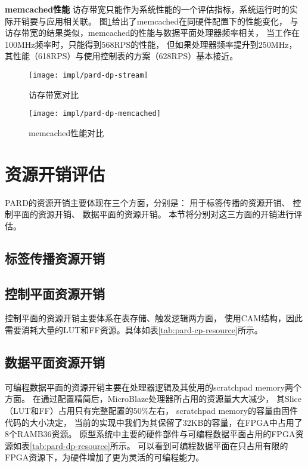 \textbf{memcached性能}\quad
访存带宽只能作为系统性能的一个评估指标，系统运行时的实际开销要与应用相关联。
图\ref{fig:pard-dp-memcached}给出了memcached在同硬件配置下的性能变化，
与访存带宽的结果类似，memcached的性能与数据平面处理器频率相关，
当工作在100MHz频率时，只能得到568RPS的性能，
但如果处理器频率提升到250MHz，其性能（618RPS）与使用控制表的方案（628RPS）基本接近。

\begin{figure}[tb]
\begin{minipage}{0.48\textwidth}
  \centering
  \texttt{[image: impl/pard-dp-stream]}
  \caption{访存带宽对比}
  \label{fig:pard-dp-stream}
\end{minipage}\hfill
\begin{minipage}{0.48\textwidth}
  \centering
  \texttt{[image: impl/pard-dp-memcached]}
  \caption{memcached性能对比}
  \label{fig:pard-dp-memcached}
\end{minipage}
\end{figure}


\section{资源开销评估}

PARD的资源开销主要体现在三个方面，分别是：
用于标签传播的资源开销、
控制平面的资源开销、
数据平面的资源开销。
本节将分别对这三方面的开销进行评估。

\subsection{标签传播资源开销}

\subsection{控制平面资源开销}

控制平面的资源开销主要体系在表存储、触发逻辑两方面，
使用CAM结构，因此需要消耗大量的LUT和FF资源。具体如表\ref{tab:pard-cp-resource}所示。


\subsection{数据平面资源开销}

可编程数据平面的资源开销主要在处理器逻辑及其使用的scratchpad memory两个方面。
在通过配置精简后，MicroBlaze处理器所占用的资源量大大减少，
其Slice（LUT和FF）占用只有完整配置的50\%左右，
scratchpad memory的容量由固件代码的大小决定，
当前的实现中我们为其保留了32KB的容量，在FPGA中占用了8个RAMB36资源。
原型系统中主要的硬件部件与可编程数据平面占用的FPGA资源如表\ref{tab:pard-dp-resource}所示。
可以看到可编程数据平面在只占用有限的FPGA资源下，为硬件增加了更为灵活的可编程能力。

